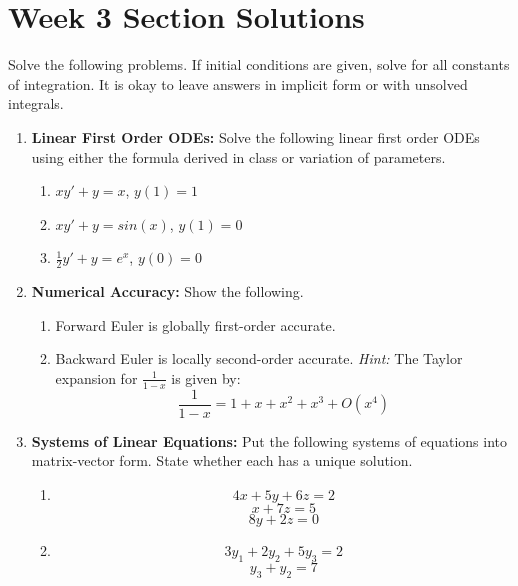\documentclass[letterpaper, fontsize=11pt]{scrartcl} %
\numberwithin{equation}{section} %
\numberwithin{figure}{section} %
\numberwithin{table}{section} %
\begin{document}

\newcommand{\horrule}[1]{\rule{\linewidth}{#1}} %


\section*{Week 3 Section Solutions}
\par Solve the following problems. If initial conditions are given, solve for all constants of integration. It is okay to leave answers in implicit form or with unsolved integrals. 

\begin{enumerate}
\item \textbf{Linear First Order ODEs:} Solve the following linear first order ODEs using either the formula derived in class or variation of parameters. 
\begin{enumerate}
\item $xy' + y = x$, $y(1) = 1$ 


\item $xy' + y = sin(x)$, $y(1) = 0$ 

\item $\frac{1}{2} y' + y = e^x$, $y(0) = 0$

\end{enumerate}


\item \textbf{Numerical Accuracy:} Show the following.
\begin{enumerate}
\item Forward Euler is globally first-order accurate. \newline

\item Backward Euler is locally second-order accurate.\newline
\textit{Hint:} The Taylor expansion for $\frac{1}{1-x}$ is given by:
$$\frac{1}{1-x} = 1 + x + x^2 + x^3 + O(x^4)$$
\end{enumerate}

\item \textbf{Systems of Linear Equations:} Put the following systems of equations into matrix-vector form. State whether each has a unique solution. 
\begin{enumerate}
\item $$ 4x + 5y + 6z = 2$$
$$x + 7z = 5$$
$$8y + 2z = 0$$

\item
$$ 3 y_1 + 2 y_2 + 5y_3 = 2$$
$$ y_3 + y_2 = 7$$

\end{enumerate}
\end{enumerate}

\end{document}
